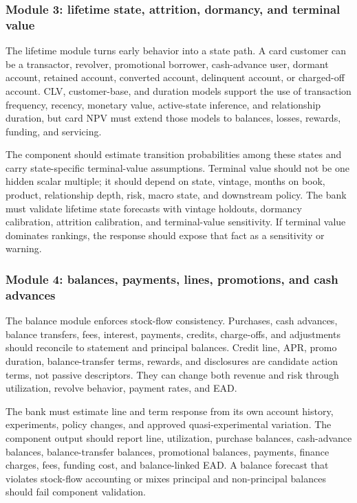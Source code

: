 \documentclass[11pt]{article}
\newcommand{\1}{\mathbf{1}}
\begin{document}
\subsubsection{Module 3: lifetime state, attrition, dormancy, and terminal value}
\label{subsec:module-lifetime}

The lifetime module turns early behavior into a state path. A card customer
can be a transactor, revolver, promotional borrower, cash-advance user,
dormant account, retained account, converted account, delinquent account, or
charged-off account. CLV, customer-base, and duration models support the use
of transaction frequency, recency, monetary value, active-state inference, and
relationship duration, but card NPV must extend those models to balances,
losses, rewards, funding, and servicing.

The component should estimate transition probabilities among these states and
carry state-specific terminal-value assumptions. Terminal value should not be
one hidden scalar multiple; it should depend on state, vintage, months on book,
product, relationship depth, risk, macro state, and downstream policy. The
bank must validate lifetime state forecasts with vintage holdouts, dormancy
calibration, attrition calibration, and terminal-value sensitivity. If terminal
value dominates rankings, the response should expose that fact as a sensitivity
or warning.

\subsubsection{Module 4: balances, payments, lines, promotions, and cash advances}
\label{subsec:module-balances}

The balance module enforces stock-flow consistency. Purchases, cash advances,
balance transfers, fees, interest, payments, credits, charge-offs, and
adjustments should reconcile to statement and principal balances. Credit line,
APR, promo duration, balance-transfer terms, rewards, and disclosures are
candidate action terms, not passive descriptors. They can change both revenue
and risk through utilization, revolve behavior, payment rates, and EAD.

The bank must estimate line and term response from its own account history,
experiments, policy changes, and approved quasi-experimental variation. The
component output should report line, utilization, purchase balances,
cash-advance balances, balance-transfer balances, promotional balances,
payments, finance charges, fees, funding cost, and balance-linked EAD. A
balance forecast that violates stock-flow accounting or mixes principal and
non-principal balances should fail component validation.
\end{document}

